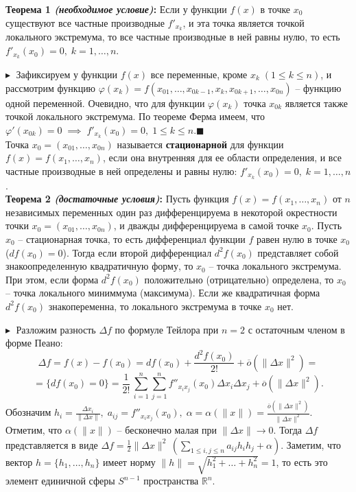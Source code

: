 \textbf{Теорема 1 \textit{(необходимое условие)}:} Если у функции $f(x)$ в точке $x_0$ существуют все частные производные $f'_{x_k}$, и эта точка является точкой локального экстремума, то все частные производные в ней равны нулю, то есть $f'_{x_k}(x_0) = 0, \; k = 1, \ldots, n$.

$\blacktriangleright\;$ Зафиксируем у функции $f(x)$ все переменные, кроме $x_k \;(1\leq k\leq n)$, и рассмотрим функцию $\varphi(x_k) = f(x_{01}, \ldots, x_{0 k-1}, x_k, x_{0 k+1}, \ldots, x_{0 n})$ -- функцию одной переменной. Очевидно, что для функции $\varphi(x_k)$ точка $x_{0k}$ является также точкой локального экстремума. По теореме Ферма имеем, что $\varphi'(x_{0k}) = 0 \;\implies\; f'_{x_k} (x_0) = 0, \; 1\leq k \leq n$.\;$\blacksquare$\\

 Точка $x_0 = (x_{01}, \ldots, x_{0n})$ называется \textbf{стационарной} для функции $f(x) = f(x_1, \ldots, x_n)$, если она внутренняя для ее области определения, и все частные производные в ней определены и равны нулю: $f'_{x_k}(x_0) = 0, \; k = 1, \ldots, n$.\\

\textbf{Теорема 2 \textit{(достаточные условия)}:} Пусть функция $f(x) = f(x_1, \ldots, x_n)$ от $n$ независимых переменных один раз дифференцируема в некоторой окрестности точки $x_0 = (x_{01}, \ldots, x_{0n})$, и дважды дифференцируема в самой точке $x_0$. Пусть $x_0$ -- стационарная точка, то есть дифференциал функции $f$ равен нулю в точке $x_0$ ($d f(x_0) = 0$). Тогда если второй дифференциал $d^2 f(x_0)$ представляет собой знакоопределенную квадратичную форму, то $x_0$ -- точка локального экстремума. При этом, если форма $d^2f(x_0)$ положительно (отрицательно) определена, то $x_0$ -- точка локального миниммума (максимума). Если же квадратичная форма $d^2 f(x_0)$ знакопеременна, то локального экстремума в точке $x_0$ нет.

$\blacktriangleright\;$ Разложим разность $\Delta f$ по формуле Тейлора при $n = 2$ с остаточным членом в форме Пеано:
$$
\Delta f = f(x) - f(x_0) = d f(x_0) + \frac{d^2 f(x_0)}{2!} + \overline{o}(\|\Delta x\|^2) =$$
$$= \{ d f(x_0) = 0\} = \frac{1}{2!}\,\sum_{i = 1}^n \sum_{j =1}^n f''_{x_i x_j}(x_0) \Delta x_i \Delta x_j + \overline{o}(\|\Delta x\|^2).
$$
Обозначим $h_i = \frac{\Delta x_i}{\|\Delta x\|}, \; a_{ij} = f''_{x_i x_j}(x_0), \; \alpha = \alpha (\|x\|) = \frac{\overline{o}(\|\Delta x\|^2)}{\|\Delta x\|^2}$. 
Отметим, что $\alpha(\|x\|)$ -- бесконечно малая при $\|\Delta x\| \to 0$. 
Тогда $\Delta f$ представляется в виде $\Delta f = \frac{1}{2}\|\Delta x\|^2\, \left( \sum_{1\leq i, j \leq n} a_{ij} h_i h_j + \alpha\right)$. 
Заметим, что вектор $h = \{ h_1, \ldots, h_n\}$ имеет норму $\|h\| = \sqrt{h_1^2 + \ldots + h_n^2} = 1$, то есть это элемент единичной сферы $S^{n-1}$ пространства $\mathbb{R}^n$.

